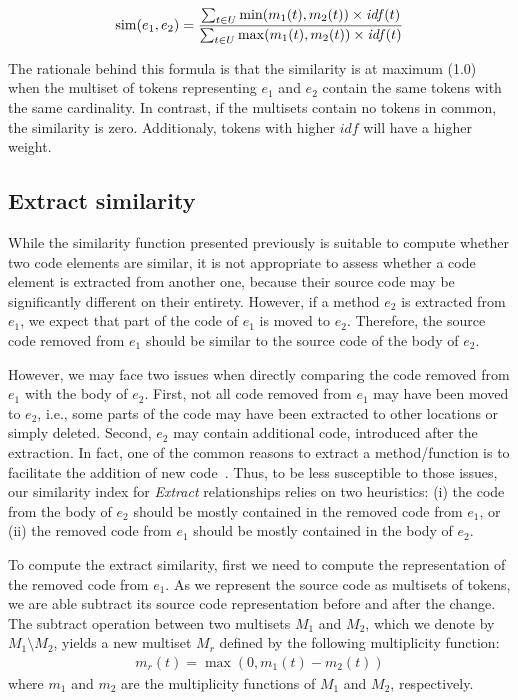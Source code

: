 \begin{align}
\operatorname{sim}(e_1, e_2) = \frac{\sum_{t \in U} \min(m_1(t), m_2(t)) \times \mathit{idf}(t) }
                        {\sum_{t \in U} \max(m_1(t), m_2(t)) \times \mathit{idf}(t) }
\end{align}

The rationale behind this formula is that the similarity is at maximum (1.0) when the multiset of tokens representing $e_1$ and $e_2$ contain the same tokens with the same cardinality. In contrast, if the multisets contain no tokens in common, the similarity is zero. Additionaly, tokens with higher $\mathit{idf}$ will have a higher weight.


\subsection{Extract similarity}
\label{SecSimX}

While the similarity function presented previously is suitable to compute whether two code elements are similar, it is not appropriate to assess whether a code element is extracted from another one, because their source code may be significantly different on their entirety.
However, if a method $e_2$ is extracted from $e_1$, we expect that part of the code of $e_1$ is moved to $e_2$. Therefore, the source code removed from $e_1$ should be similar to the source code of the body of $e_2$.

However, we may face two issues when directly comparing the code removed from $e_1$ with the body of $e_2$. First, not all code removed from $e_1$ may have been moved to $e_2$, i.e., some parts of the code may have been extracted to other locations or simply deleted. Second, $e_2$ may contain additional code, introduced after the extraction. In fact, one of the common reasons to extract a method/function is to facilitate the addition of new code~\cite{fse2016-why-we-refactor}. Thus, to be less susceptible to those issues, our similarity index for \textit{Extract} relationships relies on two heuristics: (i) the code from the body of $e_2$ should be mostly contained in the removed code from $e_1$, or (ii) the removed code from $e_1$ should be mostly contained in the body of $e_2$.

To compute the extract similarity, first we need to compute the representation of the removed code from $e_1$. As we represent the source code as multisets of tokens, we are able subtract its source code representation before and after the change. The subtract operation between two multisets $M_1$ and $M_2$, which we denote by $M_1 \setminus M_2$, yields a new multiset $M_r$ defined by the following multiplicity function:
\begin{align}
m_r(t) = \max(0, m_1(t) - m_2(t))
\end{align}
where $m_1$ and $m_2$ are the multiplicity functions of $M_1$ and $M_2$, respectively.

